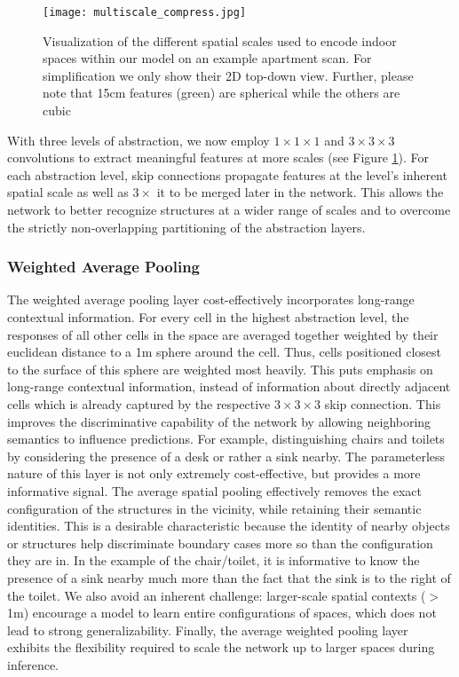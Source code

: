 \documentclass[runningheads]{llncs}
\begin{document}
\begin{figure}[t]
    \centering
 \texttt{[image: multiscale\_compress.jpg]}
    \caption{Visualization of the different spatial scales used to encode indoor spaces within our model on an example apartment scan. For simplification we only show their 2D top-down view. Further, please note that 15cm features (green) are spherical while the others are cubic}
    \label{fig:multiscale}  
\end{figure}

With three levels of abstraction, we now employ $1 \times 1 \times 1$ and $3 \times 3 \times 3$ convolutions to extract meaningful features at more scales (see Figure \ref{fig:multiscale}). For each abstraction level, skip connections propagate features at the level's inherent spatial scale as well as $3 \times$ it to be merged later in the network. This allows the network to better recognize structures at a wider range of scales and to overcome the strictly non-overlapping partitioning of the abstraction layers. 

\subsubsection{Weighted Average Pooling}

The weighted average pooling layer cost-effectively incorporates long-range contextual information. For every cell in the highest abstraction level, the responses of all other cells in the space are averaged together weighted by their euclidean distance to a 1m sphere around the cell. Thus, cells positioned closest to the surface of this sphere are weighted most heavily. This puts emphasis on long-range contextual information, instead of information about directly adjacent cells which is already captured by the respective $3\times 3\times 3$ skip connection. This improves the discriminative capability of the network by allowing neighboring semantics to influence predictions. For example, distinguishing chairs and toilets by considering the presence of a desk or rather a sink nearby. The parameterless nature of this layer is not only extremely cost-effective, but provides a more informative signal. The average spatial pooling effectively removes the exact configuration of the structures in the vicinity, while retaining their semantic identities. This is a desirable characteristic because the identity of nearby objects or structures help discriminate boundary cases more so than the configuration they are in. In the example of the chair/toilet, it is informative to know the presence of a sink nearby much more than the fact that the sink is to the right of the toilet. We also avoid an inherent challenge: larger-scale spatial contexts ($>$1m) encourage a model to learn entire configurations of spaces, which does not lead to strong generalizability. Finally, the average weighted pooling layer exhibits the flexibility required to scale the network up to larger spaces during inference.
\end{document}

